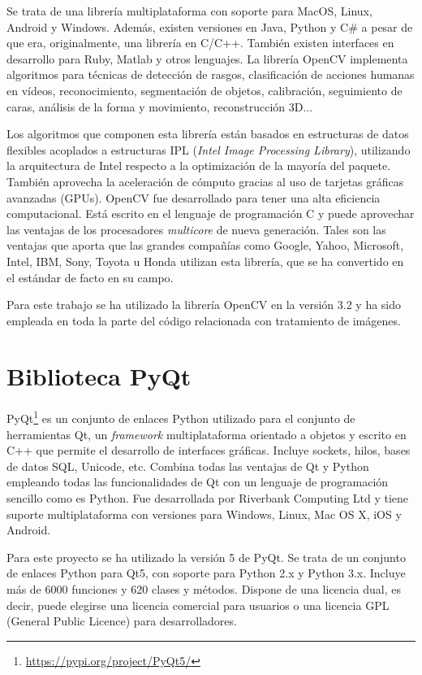 Se trata de una librería multiplataforma con soporte para MacOS, Linux, Android y Windows. Además, existen versiones en Java, Python y C\# a pesar de que era, originalmente, una librería en C/C++. También existen interfaces en desarrollo para Ruby, Matlab y otros lenguajes.
La librería OpenCV implementa algoritmos para técnicas de detección de rasgos, clasificación de acciones humanas en vídeos, reconocimiento, segmentación de objetos, calibración, seguimiento de caras, análisis de la forma y movimiento, reconstrucción 3D... 

Los algoritmos que componen esta librería están basados en estructuras de datos flexibles acoplados a estructuras IPL (\textit{Intel Image Processing Library}), utilizando la arquitectura de Intel respecto a la optimización de la mayoría del paquete. También aprovecha la aceleración de cómputo gracias al uso de tarjetas gráficas avanzadas (GPUs). OpenCV fue desarrollado para tener una alta eficiencia computacional. Está escrito en el lenguaje de programación C y puede aprovechar las ventajas de los procesadores \textit{multicore} de nueva generación. Tales son las ventajas que aporta que las grandes compañías como Google, Yahoo, Microsoft, Intel, IBM, Sony, Toyota u Honda utilizan esta librería, que se ha convertido en el estándar de facto en su campo.

Para este trabajo se ha utilizado la librería OpenCV en la versión 3.2 y ha sido empleada en toda la parte del código relacionada con tratamiento de imágenes.

\section{Biblioteca PyQt}
PyQt\footnote{\url{https://pypi.org/project/PyQt5/}} es un conjunto de enlaces Python utilizado para el conjunto de herramientas Qt, un \textit{framework} multiplataforma orientado a objetos y escrito en C++ que permite el desarrollo de interfaces gráficas. Incluye sockets, hilos, bases de datos SQL, Unicode, etc. Combina todas las ventajas de Qt y Python empleando todas las funcionalidades de Qt con un lenguaje de programación sencillo como es Python. Fue desarrollada por Riverbank Computing Ltd y tiene suporte multiplataforma con versiones para Windows, Linux, Mac OS X, iOS y Android.

Para este proyecto se ha utilizado la versión 5 de PyQt. Se trata de un conjunto de enlaces Python para Qt5, con soporte para Python 2.x y Python 3.x. Incluye más de 6000 funciones y 620 clases y métodos. Dispone de una licencia dual, es decir, puede elegirse una licencia comercial para usuarios o una licencia GPL (General Public Licence) para desarrolladores.

